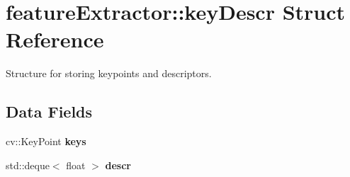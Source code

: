 \hypertarget{structfeatureExtractor_1_1keyDescr}{
\section{featureExtractor::keyDescr Struct Reference}
\label{structfeatureExtractor_1_1keyDescr}
}


Structure for storing keypoints and descriptors.  


\subsection*{Data Fields}
\begin{DoxyCompactItemize}
\item 
\hypertarget{structfeatureExtractor_1_1keyDescr_aa964a816363af4acf477a9f22ed3734b}{
cv::KeyPoint {\bfseries keys}}
\label{structfeatureExtractor_1_1keyDescr_aa964a816363af4acf477a9f22ed3734b}

\item 
\hypertarget{structfeatureExtractor_1_1keyDescr_a0e99c1086e9f2910391c7455462259ed}{
std::deque$<$ float $>$ {\bfseries descr}}
\label{structfeatureExtractor_1_1keyDescr_a0e99c1086e9f2910391c7455462259ed}

\end{DoxyCompactItemize}
